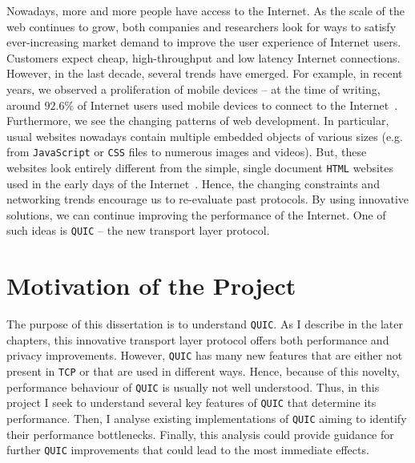 \documentclass[12pt,a4paper,twoside,openright]{report}
\begin{document}







Nowadays, more and more people have access to the Internet.
As the scale of the web continues to grow, both companies and researchers look for ways to satisfy ever-increasing market demand to improve the user experience of Internet users.
Customers expect cheap, high-throughput and low latency Internet connections.
However, in the last decade, several trends have emerged.
For example, in recent years, we observed a proliferation of mobile devices -- at the time of writing, around $92.6\%$ of Internet users used mobile devices to connect to the Internet~\cite{bib_number_of_mobile_users}.
Furthermore, we see the changing patterns of web development.
In particular, usual websites nowadays contain multiple embedded objects of various sizes (e.g. from \texttt{JavaScript} or \texttt{CSS} files to numerous images and videos)\cite{bib_Netdev_0x13_QUIC_Tutorial}.
But, these websites look entirely different from the simple, single document \texttt{HTML} websites used in the early days of the Internet~\cite{RudmanRiaan2016DW3o}.
Hence, the changing constraints and networking trends encourage us to re-evaluate past protocols.
By using innovative solutions, we can continue improving the performance of the Internet. 
One of such ideas is \texttt{QUIC} -- the new transport layer protocol.

\section{Motivation of the Project}

The purpose of this dissertation is to understand \texttt{QUIC}.
As I describe in the later chapters, this innovative transport layer protocol offers both performance and privacy improvements.
However, \texttt{QUIC} has many new features that are either not present in \texttt{TCP} or that are used in different ways.
Hence, because of this novelty, performance behaviour of \texttt{QUIC} is usually not well understood.
Thus, in this project I seek to understand several key features of \texttt{QUIC} that determine its performance.
Then, I analyse existing implementations of \texttt{QUIC} aiming to identify their performance bottlenecks.
Finally, this analysis could provide guidance for further \texttt{QUIC} improvements that could lead to the most immediate effects.
\end{document}

